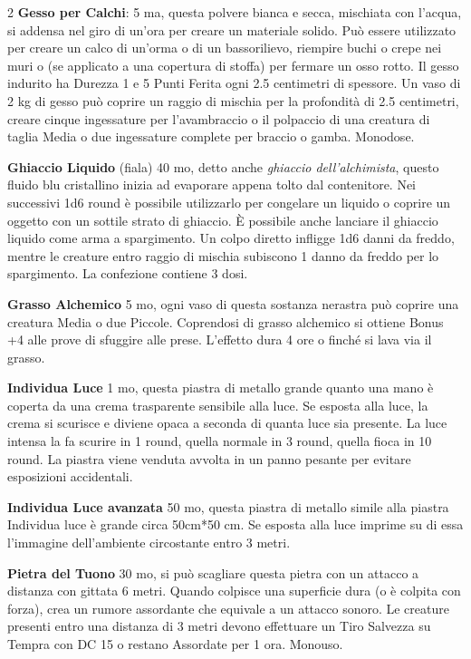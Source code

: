 \begin{multicols}{2}
\textbf{Gesso per Calchi}: 5 ma, questa polvere bianca e secca, mischiata con l'acqua, si addensa nel giro di un'ora per creare un materiale solido. Può essere utilizzato per creare un calco di un'orma o di un bassorilievo, riempire buchi o crepe nei muri o (se applicato a una copertura di stoffa) per fermare un osso rotto. Il gesso indurito ha Durezza 1 e 5 Punti Ferita ogni 2.5 centimetri di spessore. Un vaso di 2 kg di gesso può coprire un raggio di mischia per la profondità di 2.5 centimetri, creare cinque ingessature per l'avambraccio o il polpaccio di una creatura di taglia Media o due ingessature complete per braccio o gamba. Monodose.

\textbf{Ghiaccio Liquido} (fiala) 40 mo, detto anche \emph{ghiaccio dell'alchimista}, questo fluido blu cristallino inizia ad evaporare appena tolto dal contenitore. Nei successivi 1d6 round è possibile utilizzarlo per congelare un liquido o coprire un oggetto con un sottile strato di ghiaccio. È possibile anche lanciare il ghiaccio liquido come arma a spargimento. Un colpo diretto infligge 1d6 danni da freddo, mentre le creature entro raggio di mischia subiscono 1 danno da freddo per lo spargimento. La confezione contiene 3 dosi.

\textbf{Grasso Alchemico} 5 mo, ogni vaso di questa sostanza nerastra può coprire una creatura Media o due Piccole. Coprendosi di grasso alchemico si ottiene Bonus +4 alle prove di sfuggire alle prese. L'effetto dura 4 ore o finché si lava via il grasso.

\textbf{Individua Luce} 1 mo, questa piastra di metallo grande quanto una mano è coperta da una crema trasparente sensibile alla luce. Se esposta alla luce, la crema si scurisce e diviene opaca a seconda di quanta luce sia presente. La luce intensa la fa scurire in 1 round, quella normale in 3 round, quella fioca in 10 round.
La piastra viene venduta avvolta in un panno pesante per evitare esposizioni accidentali.

\textbf{Individua Luce avanzata} 50 mo, questa piastra di metallo simile alla piastra Individua luce è grande circa 50cm*50 cm. Se esposta alla luce imprime su di essa l'immagine dell'ambiente circostante entro 3 metri.

\textbf{Pietra del Tuono} 30 mo, si può scagliare questa pietra con un attacco a distanza con gittata 6 metri. Quando colpisce una superficie dura (o è colpita con forza), crea un rumore assordante che equivale a un attacco sonoro. Le creature presenti entro una distanza di 3 metri devono effettuare un Tiro Salvezza su Tempra con DC 15 o restano Assordate per 1 ora. Monouso.


\end{multicols}
